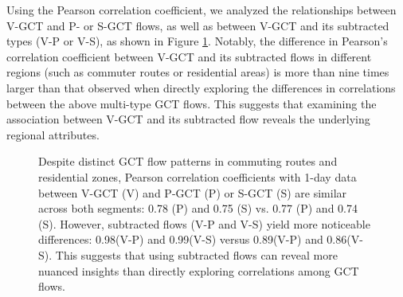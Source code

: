 \documentclass[letterpaper]{article} %
\begin{document}
Using the Pearson correlation coefficient, we analyzed the relationships between V-GCT and P- or S-GCT flows, as well as between V-GCT and its subtracted types (V-P or V-S), as shown in Figure \ref{fig:functionality}. Notably, the difference in Pearson's correlation coefficient between V-GCT and its subtracted flows in different regions (such as commuter routes or residential areas) is more than nine times larger than that observed when directly exploring the differences in correlations between the above multi-type GCT flows. This suggests that examining the association between V-GCT and its subtracted flow reveals the underlying regional attributes.

\begin{figure}
  \centering
  
  \caption{Despite distinct GCT flow patterns in commuting routes and residential zones, Pearson correlation coefficients with 1-day data between V-GCT (V) and P-GCT (P) or S-GCT (S) are similar across both segments: 0.78 (P) and 0.75 (S) vs. 0.77 (P) and 0.74 (S). However, subtracted flows (V-P and V-S) yield more noticeable differences: 0.98(V-P) and 0.99(V-S) versus 0.89(V-P) and 0.86(V-S). This suggests that using subtracted flows can reveal more nuanced insights than directly exploring correlations among GCT flows.}
  \label{fig:functionality}
\end{figure}
\end{document}
